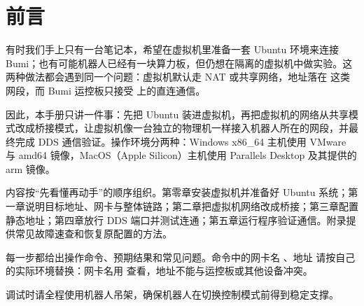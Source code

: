 \chapter*{前言}

有时我们手上只有一台笔记本，希望在虚拟机里准备一套 Ubuntu 环境来连接 Bumi；也有可能机器人已经有一块算力板，但仍想在隔离的虚拟机中做实验。这两种做法都会遇到同一个问题：虚拟机默认走 NAT 或共享网络，地址落在  这类网段，而 Bumi 运控板只接受  上的直连通信。

因此，本手册只讲一件事：先把 Ubuntu 装进虚拟机，再把虚拟机的网络从共享模式改成桥接模式，让虚拟机像一台独立的物理机一样接入机器人所在的网段，并最终完成 DDS 通信验证。操作环境分两种：Windows x86\_64 主机使用 VMware 与 amd64 镜像，MacOS（Apple Silicon）主机使用 Parallels Desktop 及其提供的 arm 镜像。

内容按“先看懂再动手”的顺序组织。第零章安装虚拟机并准备好 Ubuntu 系统；第一章说明目标地址、网卡与整体链路；第二章把虚拟机网络改成桥接；第三章配置静态地址；第四章放行 DDS 端口并测试连通；第五章运行程序验证通信。附录提供常见故障速查和恢复原配置的方法。

每一步都给出操作命令、预期结果和常见问题。命令中的网卡名 、地址  请按自己的实际环境替换：网卡名用  查看，地址不能与运控板或其他设备冲突。

调试时请全程使用机器人吊架，确保机器人在切换控制模式前得到稳定支撑。
